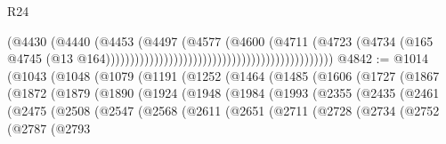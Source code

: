 \begin{lexlean}{R24}
\begin{coremodule}
                                                                            (@4430
                                                                              (@4440
                                                                                (@4453
                                                                                  (@4497
                                                                                    (@4577
                                                                                      (@4600
                                                                                        (@4711
                                                                                          (@4723
                                                                                            (@4734
                                                                                              (@165
                                                                                                @4745
                                                                                                (@13
                                                                                                  @164)))))))))))))))))))))))))))))))))))))))))))))))
@4842 := @1014
    (@1043
      (@1048
        (@1079
          (@1191
            (@1252
              (@1464
                (@1485
                  (@1606
                    (@1727
                      (@1867
                        (@1872
                          (@1879
                            (@1890
                              (@1924
                                (@1948
                                  (@1984
                                    (@1993
                                      (@2355
                                        (@2435
                                          (@2461
                                            (@2475
                                              (@2508
                                                (@2547
                                                  (@2568
                                                    (@2611
                                                      (@2651
                                                        (@2711
                                                          (@2728
                                                            (@2734
                                                              (@2752
                                                                (@2787
                                                                  (@2793

\end{coremodule}
\end{lexlean}

